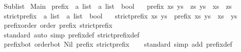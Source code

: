 %
\begin{isabellebody}%
%
%
\isadelimdocument
%
\endisadelimdocument
%
\isatagdocument
%
\isamarkuptrue%
%
\endisatagdocument
{\isafolddocument}%
%
\isadelimdocument
%
\endisadelimdocument
%
\isadelimtheory
%
\endisadelimtheory
%
\isatagtheory
{}\isamarkupfalse%
\ Sublist\isanewline
{}\ Main\isanewline
{}%
\endisatagtheory
{\isafoldtheory}%
%
\isadelimtheory
%
\endisadelimtheory
%
\isadelimdocument
%
\endisadelimdocument
%
\isatagdocument
%
\isamarkuptrue%
%
\endisatagdocument
{\isafolddocument}%
%
\isadelimdocument
%
\endisadelimdocument
{}\isamarkupfalse%
\ prefix\ {\isacharcolon}{\isacharcolon}\ {\isachardoublequoteopen}{\isacharprime}a\ list\ {\isasymRightarrow}\ {\isacharprime}a\ list\ {\isasymRightarrow}\ bool{\isachardoublequoteclose}\isanewline
\ \ \ {\isachardoublequoteopen}prefix\ xs\ ys\ {\isasymlongleftrightarrow}\ {\isacharparenleft}{\isasymexists}zs{\isachardot}\ ys\ {\isacharequal}\ xs\ {\isacharat}\ zs{\isacharparenright}{\isachardoublequoteclose}\isanewline
\isanewline
{}\isamarkupfalse%
\ strict{\isacharunderscore}prefix\ {\isacharcolon}{\isacharcolon}\ {\isachardoublequoteopen}{\isacharprime}a\ list\ {\isasymRightarrow}\ {\isacharprime}a\ list\ {\isasymRightarrow}\ bool{\isachardoublequoteclose}\isanewline
\ \ \ {\isachardoublequoteopen}strict{\isacharunderscore}prefix\ xs\ ys\ {\isasymlongleftrightarrow}\ prefix\ xs\ ys\ {\isasymand}\ xs\ {\isasymnoteq}\ ys{\isachardoublequoteclose}\isanewline
\isanewline
{}\isamarkupfalse%
\ prefix{\isacharunderscore}order{\isacharcolon}\ order\ prefix\ strict{\isacharunderscore}prefix\isanewline
%
\isadelimproof
\ \ %
\endisadelimproof
%
\isatagproof
{}\isamarkupfalse%
\ standard\ {\isacharparenleft}auto\ simp{\isacharcolon}\ prefix{\isacharunderscore}def\ strict{\isacharunderscore}prefix{\isacharunderscore}def{\isacharparenright}%
\endisatagproof
{\isafoldproof}%
%
\isadelimproof
\isanewline
%
\endisadelimproof
\isanewline
{}\isamarkupfalse%
\ prefix{\isacharunderscore}bot{\isacharcolon}\ order{\isacharunderscore}bot\ Nil\ prefix\ strict{\isacharunderscore}prefix\isanewline
%
\isadelimproof
\ \ %
\endisadelimproof
%
\isatagproof
{}\isamarkupfalse%
\ standard\ {\isacharparenleft}simp\ add{\isacharcolon}\ prefix{\isacharunderscore}def{\isacharparenright}%

\end{isabellebody}
